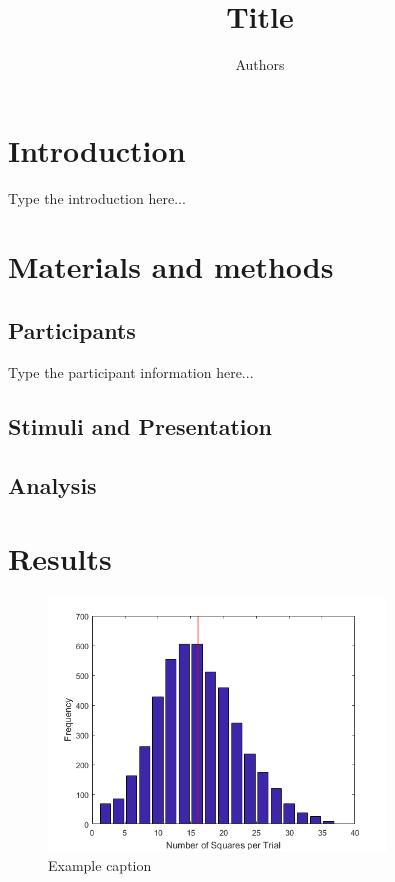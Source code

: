 \documentclass[man,12pt]{apa6} %
\title{Title}
\author{Authors}
\affiliation{Affiliation}
\begin{document}
\maketitle
\linenumbers %


\section{Introduction}

Type the introduction here...

\section{Materials and methods} %

\subsection{Participants}

Type the participant information here...

\subsection{Stimuli and Presentation}
\subsection{Analysis}

\section{Results}


\begin{figure}[h!] %
	\centering	
	\includegraphics[width=0.8\textwidth]{exampleImage.png}
	\caption{Example caption}
	\label{fig:exampleImage}	
\end{figure} 
\end{document}

